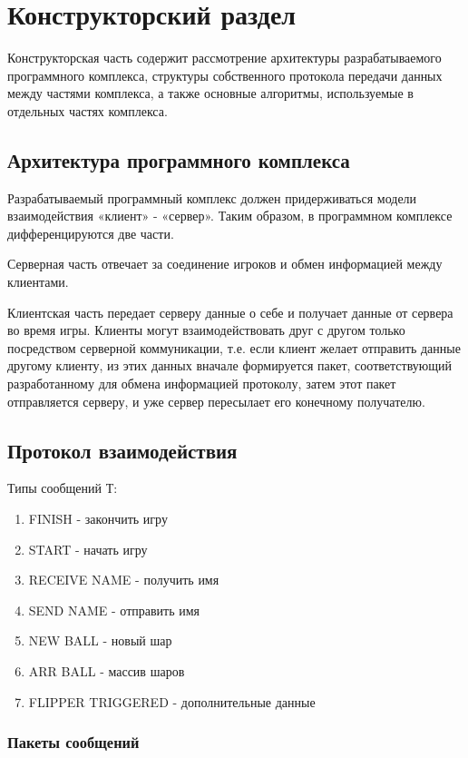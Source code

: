 \chapter{Конструкторский раздел}

Конструкторская часть содержит рассмотрение архитектуры разрабатываемого программного комплекса, структуры собственного протокола передачи данных между частями комплекса, а также основные алгоритмы, используемые в отдельных частях комплекса.

\section{Архитектура программного комплекса}
Разрабатываемый программный комплекс должен придерживаться модели взаимодействия «клиент» - «сервер». Таким образом, в программном комплексе дифференцируются две части. 

Серверная часть отвечает за соединение игроков и обмен информацией между клиентами. 

Клиентская часть передает серверу данные о себе и получает данные от сервера во время игры. Клиенты могут взаимодействовать друг с другом только посредством серверной коммуникации, т.е. если клиент желает отправить данные другому клиенту, из этих данных вначале формируется пакет, соответствующий разработанному для обмена информацией протоколу, затем этот пакет отправляется серверу, и уже сервер пересылает его конечному получателю.

\section{Протокол взаимодействия}

Типы сообщений Т:
\begin{enumerate}
\item FINISH - закончить игру
\item START - начать игру
\item RECEIVE NAME - получить имя
\item SEND NAME - отправить имя
\item NEW BALL - новый шар
\item ARR BALL - массив шаров
\item FLIPPER TRIGGERED - дополнительные данные
\end{enumerate}

\subsection{Пакеты сообщений}

